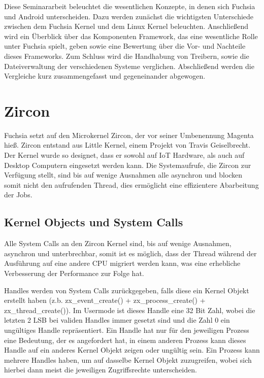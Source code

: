 \documentclass[a4paper]{scrartcl}
\begin{document}
Diese Seminararbeit beleuchtet die wesentlichen Konzepte, in denen sich Fuchsia und Android unterscheiden. Dazu werden zunächst die wichtigsten Unterschiede zwischen dem Fuchsia Kernel und dem Linux Kernel beleuchten. Anschließend wird ein Überblick über das Komponenten Framework, das eine wesentliche Rolle unter Fuchsia spielt, geben sowie eine Bewertung über die Vor- und Nachteile dieses Frameworks. Zum Schluss wird die Handhabung von Treibern, sowie die Dateiverwaltung der verschiedenen Systeme verglichen. Abschließend werden die Vergleiche kurz zusammengefasst und gegeneinander abgewogen.
\section{Zircon}
Fuchsia setzt auf den Microkernel Zircon, der vor seiner Umbenennung Magenta hieß. Zircon entstand aus Little Kernel, einem Projekt von Travis Geiselbrecht. Der Kernel wurde so designet, dass er sowohl auf IoT Hardware, als auch auf Desktop Computern eingesetzt werden kann. \cite{DaveAltavilla.30.Juni2019} Die Systemaufrufe, die Zircon zur Verfügung stellt, sind bis auf wenige Ausnahmen alle asynchron und blocken somit nicht den aufrufenden Thread, dies ermöglicht eine effizientere Abarbeitung der Jobs.
\subsection{Kernel Objects und System Calls}
Alle System Calls an den Zircon Kernel sind, bis auf wenige Ausnahmen, asynchron und unterbrechbar, somit ist es möglich, dass der Thread während der Ausführung auf eine andere CPU migriert werden kann, was eine erhebliche Verbesserung der Performance zur Folge hat.

Handles werden von System Calls zurückgegeben, falls diese ein Kernel Objekt erstellt haben (z.b. zx\_event\_create() + zx\_process\_create() + zx\_thread\_create()). Im Usermode ist dieses Handle eine 32 Bit Zahl, wobei die letzten 2 LSB bei validen Handles immer gesetzt sind und die Zahl 0 ein ungültiges Handle repräsentiert. Ein Handle hat nur für den jeweiligen Prozess eine Bedeutung, der es angefordert hat, in einem anderen Prozess kann dieses Handle auf ein anderes Kernel Objekt zeigen oder ungültig sein. Ein Prozess kann mehrere Handles haben, um auf dasselbe Kernel Objekt zuzugreifen, wobei sich hierbei dann meist die jeweiligen Zugriffsrechte unterscheiden.
\end{document}
